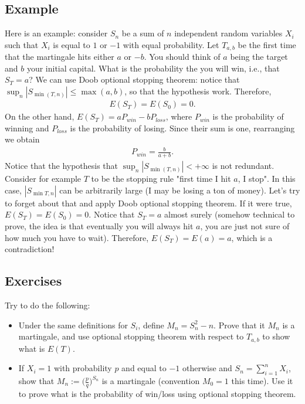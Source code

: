 \documentclass[12pt]{article}
\begin{document}
\subsection{Example}
Here is an example: consider $S_n$ be a sum of $n$ independent random variables $X_i$ such that $X_i$ is equal to $1$ or $-1$ with equal probability. Let $T_{a,b}$ be the first time that the martingale hits either $a$ or $-b$. You should think of $a$ being the target and $b$ your initial capital. What is the probability the you will win, i.e., that $S_T=a$? We can use Doob optional stopping theorem: notice that $\sup_{n}|S_{\min(T,n)}|\leq \max(a,b)$, so that the hypothesis work. Therefore, 
\begin{align*}
E(S_T)=E(S_0)=0.
\end{align*}
On the other hand, $E(S_T)=aP_{win}-bP_{loss}$, where $P_{win}$ is the probability of winning and $P_{loss}$ is the probability of losing. Since their sum is one, rearranging we obtain
\begin{align*}
P_{win}=\frac{b}{a+b}.
\end{align*}
Notice that the hypothesis that $\sup_{n}|S_{\min(T,n)}|<+\infty$ is not redundant. Consider for example $T$ to be the stopping rule "first time I hit $a$, I stop". In this case, $|S_{\min T,n}|$ can be arbitrarily large (I may be losing a ton of money). Let's try to forget about that and apply Doob optional stopping theorem. If it were true, $E(S_T)=E(S_0)=0$. Notice that $S_T=a$ almost surely (somehow technical to prove, the idea is that eventually you will always hit $a$, you are just not sure of how much you have to wait). Therefore, $E(S_T)=E(a)=a$, which is a contradiction!
\subsection{Exercises}
Try to do the following:
\begin{itemize}
\item Under the same definitions for $S_i$, define $M_n=S_n^2-n$. Prove that it $M_n$ is a martingale, and use optional stopping theorem with respect to $T_{a,b}$ to show what is $E(T)$. 
\item If $X_i=1$ with probability $p$ and equal to $-1$ otherwise and $S_n=\sum_{i=1}^n X_i$, show that $M_n:=\Big(\frac{p}{q}\Big)^{S_n}$ is a martingale (convention $M_0=1$ this time). Use it to prove what is the probability of win/loss using optional stopping theorem.
\end{itemize}
\end{document}
